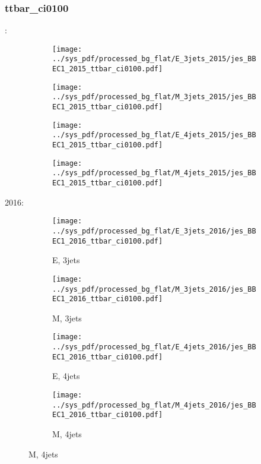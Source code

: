 \documentclass{beamer}
\begin{document}
\begin{frame}
\frametitle{ttbar_ci0100}
\fontsize{5}{1}:
\begin{figure}
\centering
\begin{subfigure}[b]{0.24\textwidth}
\texttt{[image: ../sys\_pdf/processed\_bg\_flat/E\_3jets\_2015/jes\_BBEC1\_2015\_ttbar\_ci0100.pdf]}
\end{subfigure}
\begin{subfigure}[b]{0.24\textwidth}
\texttt{[image: ../sys\_pdf/processed\_bg\_flat/M\_3jets\_2015/jes\_BBEC1\_2015\_ttbar\_ci0100.pdf]}
\end{subfigure}
\begin{subfigure}[b]{0.24\textwidth}
\texttt{[image: ../sys\_pdf/processed\_bg\_flat/E\_4jets\_2015/jes\_BBEC1\_2015\_ttbar\_ci0100.pdf]}
\end{subfigure}
\begin{subfigure}[b]{0.24\textwidth}
\texttt{[image: ../sys\_pdf/processed\_bg\_flat/M\_4jets\_2015/jes\_BBEC1\_2015\_ttbar\_ci0100.pdf]}
\end{subfigure}
\end{figure}
2016:
\begin{figure}
\centering
\begin{subfigure}[b]{0.24\textwidth}
\texttt{[image: ../sys\_pdf/processed\_bg\_flat/E\_3jets\_2016/jes\_BBEC1\_2016\_ttbar\_ci0100.pdf]}
\captionsetup{font=tiny}
\caption{E, 3jets}
\end{subfigure}
\begin{subfigure}[b]{0.24\textwidth}
\texttt{[image: ../sys\_pdf/processed\_bg\_flat/M\_3jets\_2016/jes\_BBEC1\_2016\_ttbar\_ci0100.pdf]}
\captionsetup{font=tiny}
\caption{M, 3jets}
\end{subfigure}
\begin{subfigure}[b]{0.24\textwidth}
\texttt{[image: ../sys\_pdf/processed\_bg\_flat/E\_4jets\_2016/jes\_BBEC1\_2016\_ttbar\_ci0100.pdf]}
\captionsetup{font=tiny}
\caption{E, 4jets}
\end{subfigure}
\begin{subfigure}[b]{0.24\textwidth}
\texttt{[image: ../sys\_pdf/processed\_bg\_flat/M\_4jets\_2016/jes\_BBEC1\_2016\_ttbar\_ci0100.pdf]}
\captionsetup{font=tiny}
\caption{M, 4jets}
\end{subfigure}
\end{figure}
\end{frame}
\end{document}
